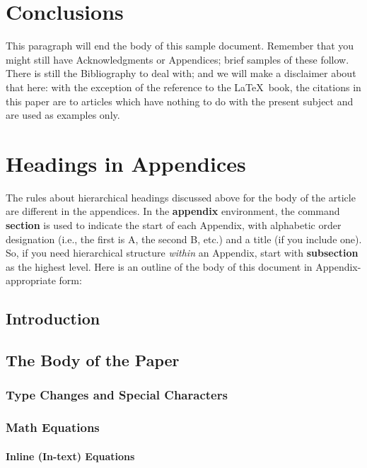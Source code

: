 \documentclass[sigconf]{acmart}
\begin{document}
\section{Conclusions}

This paragraph will end the body of this sample document.  Remember
that you might still have Acknowledgments or Appendices; brief samples
of these follow.  There is still the Bibliography to deal with; and we
will make a disclaimer about that here: with the exception of the
reference to the \LaTeX\ book, the citations in this paper are to
articles which have nothing to do with the present subject and are
used as examples only.



\appendix

\section{Headings in Appendices}

The rules about hierarchical headings discussed above for the body of
the article are different in the appendices.  In the \textbf{appendix}
environment, the command \textbf{section} is used to indicate the
start of each Appendix, with alphabetic order designation (i.e., the
first is A, the second B, etc.) and a title (if you include one).  So,
if you need hierarchical structure \textit{within} an Appendix, start
with \textbf{subsection} as the highest level. Here is an outline of
the body of this document in Appendix-appropriate form:

\subsection{Introduction}
\subsection{The Body of the Paper}
\subsubsection{Type Changes and  Special Characters}
\subsubsection{Math Equations}
\paragraph{Inline (In-text) Equations}
\end{document}
